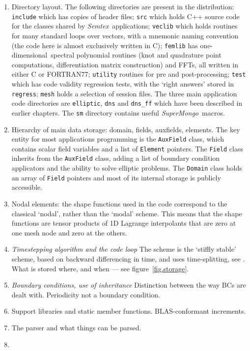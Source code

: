 \documentclass[11pt,a4paper]{report}
\newcommand{\Semtex}{\emph{Semtex}}
\newcommand{\SM}{\emph{SuperMongo}}
\newcommand\oned{one-di\-men\-sion\-al}
\begin{document}
\begin{enumerate}
\item
Directory layout.  The following directories are present in the
distribution: \verb|include| which has copies of header files;
\verb|src| which holds C++ source code for the classes shared by
\Semtex\ applications; \verb|veclib| which holds routines for many
standard loops over vectors, with a mnemonic naming convention (the
code here is almost exclusively written in C); \verb|femlib| has
\oned\ spectral polynomial routines (knot and quadrature point
computations, differentiation matrix construction) and FFTs, all
written in either C or FORTRAN77; \verb|utility| routines for pre and
post-processing; \verb|test| which has code validity regression tests,
with the `right answers' stored in \verb|regress|; \verb|mesh| holds a
selection of session files.  The three main application code
directories are \verb|elliptic|, \verb|dns| and \verb|dns_ff| which
have been described in earlier chapters.  The \verb|sm| directory
contains useful \SM\ macros.
\item
Hierarchy of main data storage: domain, fields, auxfields,
elements. The key entity for most applications programming is the
\verb|AuxField| class, which contains scalar field variables and a
list of \verb|Element| pointers.  The \verb|Field| class inherits from
the \verb|AuxField| class, adding a list of boundary condition
applicators and the ability to solve elliptic problems.  The
\verb|Domain| class holds an array of \verb|Field| pointers and most
of its internal storage is publicly accessible.
\item
Nodal elements: the shape functions used in the code correspond to the
classical `nodal', rather than the `modal' scheme. This means that the
shape functions are tensor products of 1D Lagrange interpolants that
are zero at one mesh node and zero at the others.
\item
\textsl{Timestepping algorithm and the code loop} The scheme is the `stiffly
stable' scheme, based on backward differencing in time, and uses
time-splitting, see \citet{kio91}. What is stored where, and when ---
see figure~\ref{fig.storage}.
\item
\textsl{Boundary conditions, use of inheritance} Distinction between
the way BCs are dealt with. Periodicity not a boundary condition.
\item
Support libraries and static member functions. BLAS-conformant increments.
\item
The parser and what things can be parsed.
\item

\end{enumerate}
\end{document}

